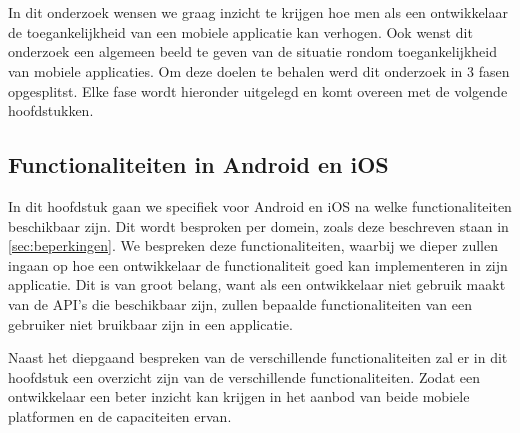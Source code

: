 
\chapter{}
\label{ch:methodologie}



In dit onderzoek wensen we graag inzicht te krijgen hoe men als een ontwikkelaar de toegankelijkheid van een mobiele applicatie kan verhogen. Ook wenst dit onderzoek een algemeen beeld te geven van de situatie rondom toegankelijkheid van mobiele applicaties. Om deze doelen te behalen werd dit onderzoek in 3 fasen opgesplitst. Elke fase wordt hieronder uitgelegd en komt overeen met de volgende hoofdstukken.

\section{Functionaliteiten in Android en iOS}
\label{section:Functionaliteiten in Android en iOS}
In dit hoofdstuk gaan we specifiek voor Android en iOS na welke functionaliteiten beschikbaar zijn. Dit wordt besproken per domein, zoals deze beschreven staan in \ref{sec:beperkingen}. We bespreken deze functionaliteiten, waarbij we dieper zullen ingaan op hoe een ontwikkelaar de functionaliteit goed kan implementeren in zijn applicatie. Dit is van groot belang, want als een ontwikkelaar niet gebruik maakt van de \gls{API}'s die beschikbaar zijn, zullen bepaalde functionaliteiten van een gebruiker niet bruikbaar zijn in een applicatie.

Naast het diepgaand bespreken van de verschillende functionaliteiten zal er in dit hoofdstuk een overzicht zijn van de verschillende functionaliteiten. Zodat een ontwikkelaar een beter inzicht kan krijgen in het aanbod van beide mobiele platformen en de capaciteiten ervan.
\newpage
